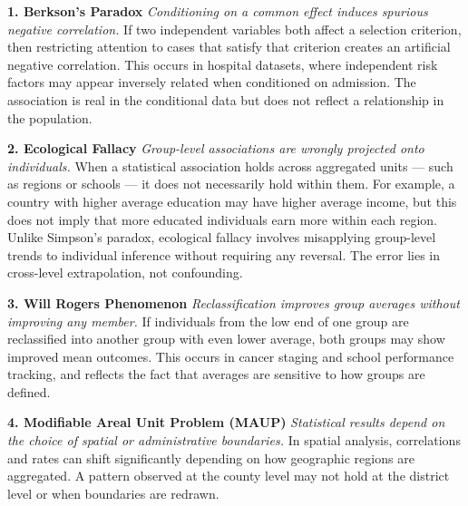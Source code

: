 \begin{tcolorbox}[
  colback=gray!2,
  colframe=gray!60,
  boxrule=0.4pt,
  width=\textwidth,
  arc=1pt,
  left=8pt,
  right=8pt,
  top=6pt,
  bottom=6pt,
  shadow={0mm}{-0.5mm}{0mm}{gray!30}
]

\textbf{1. Berkson’s Paradox}  
\emph{Conditioning on a common effect induces spurious negative correlation.}  
If two independent variables both affect a selection criterion, then restricting attention to cases that satisfy that criterion creates an artificial negative correlation. This occurs in hospital datasets, where independent risk factors may appear inversely related when conditioned on admission. The association is real in the conditional data but does not reflect a relationship in the population.

\vspace{1em}

\textbf{2. Ecological Fallacy}  
\emph{Group-level associations are wrongly projected onto individuals.}  
When a statistical association holds across aggregated units — such as regions or schools — it does not necessarily hold within them. For example, a country with higher average education may have higher average income, but this does not imply that more educated individuals earn more within each region. Unlike Simpson’s paradox, ecological fallacy involves misapplying group-level trends to individual inference without requiring any reversal. The error lies in cross-level extrapolation, not confounding.

\vspace{1em}

\textbf{3. Will Rogers Phenomenon}  
\emph{Reclassification improves group averages without improving any member.}  
If individuals from the low end of one group are reclassified into another group with even lower average, both groups may show improved mean outcomes. This occurs in cancer staging and school performance tracking, and reflects the fact that averages are sensitive to how groups are defined.

\vspace{1em}

\textbf{4. Modifiable Areal Unit Problem (MAUP)}  
\emph{Statistical results depend on the choice of spatial or administrative boundaries.}  
In spatial analysis, correlations and rates can shift significantly depending on how geographic regions are aggregated. A pattern observed at the county level may not hold at the district level or when boundaries are redrawn.


\end{tcolorbox}
